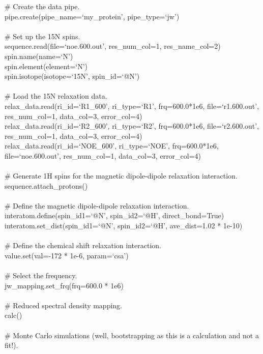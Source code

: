 \begin{exampleenv}
\# Create the data pipe. \\
pipe.create(pipe\_name=`my\_protein', pipe\_type=`jw') \\
 \\
\# Set up the 15N spins. \\
sequence.read(file=`noe.600.out', res\_num\_col=1, res\_name\_col=2) \\
spin.name(name=`N') \\
spin.element(element=`N') \\
spin.isotope(isotope=`15N', spin\_id=`@N') \\
 \\
\# Load the 15N relaxation data. \\
relax\_data.read(ri\_id=`R1\_600',  ri\_type=`R1',  frq=600.0*1e6, file=`r1.600.out', res\_num\_col=1, data\_col=3, error\_col=4) \\
relax\_data.read(ri\_id=`R2\_600',  ri\_type=`R2',  frq=600.0*1e6, file=`r2.600.out', res\_num\_col=1, data\_col=3, error\_col=4) \\
relax\_data.read(ri\_id=`NOE\_600', ri\_type=`NOE', frq=600.0*1e6, file=`noe.600.out', res\_num\_col=1, data\_col=3, error\_col=4) \\
 \\
\# Generate 1H spins for the magnetic dipole-dipole relaxation interaction. \\
sequence.attach\_protons() \\
 \\
\# Define the magnetic dipole-dipole relaxation interaction. \\
interatom.define(spin\_id1=`@N', spin\_id2=`@H', direct\_bond=True) \\
interatom.set\_dist(spin\_id1=`@N', spin\_id2=`@H', ave\_dist=1.02 * 1e-10) \\
 \\
\# Define the chemical shift relaxation interaction. \\
value.set(val=-172 * 1e-6, param=`csa') \\
 \\
\# Select the frequency. \\
jw\_mapping.set\_frq(frq=600.0 * 1e6) \\
 \\
\# Reduced spectral density mapping. \\
calc() \\
 \\
\# Monte Carlo simulations (well, bootstrapping as this is a calculation and not a fit!). \\

\end{exampleenv}
